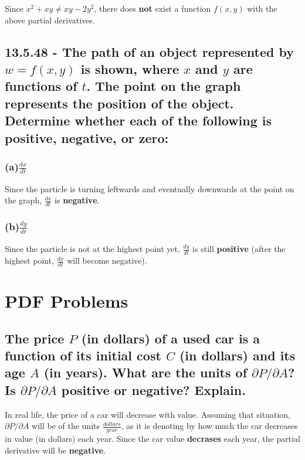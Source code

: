 \documentclass{article}
\begin{document}
\par\noindent\large Since $x^{2} + xy \neq xy - 2y^{2}$, there does \textbf{not} exist a function $f(x, y)$ with the above partial derivatives.

\subsection{13.5.48 - The path of an object represented by $w = f(x, y)$ is shown, where $x$ and $y$ are functions of $t$.  The point on the graph represents the position of the object.  Determine whether each of the following is positive, negative, or zero:}
\subsubsection{(a)$\frac{dx}{dt}$}
\par\noindent\large Since the particle is turning leftwards and eventually downwards at the point on the graph, $\frac{dx}{dt}$ is \textbf{negative}.
\subsubsection{(b)$\frac{dy}{dt}$}
\par\noindent\large Since the particle is not at the highest point yet, $\frac{dy}{dt}$ is still \textbf{positive} (after the highest point, $\frac{dx}{dt}$ will become negative).

\section{PDF Problems}
\subsection{The price $P$ (in dollars) of a used car is a function of its initial cost $C$ (in dollars) and its age $A$ (in
years). What are the units of $\partial P/\partial A$? Is $\partial P/\partial A$ positive or negative? Explain.}
\par\noindent\large  In real life, the price of a car will decrease with value.  Assuming that situation, $\partial P/\partial A$ will be of the units $\frac{dollars}{year}$, as it is denoting by how much the car decreases in value (in dollars) each year.  Since the car value \textbf{decrases} each year, the partial derivative will be \textbf{negative}.
\end{document}
